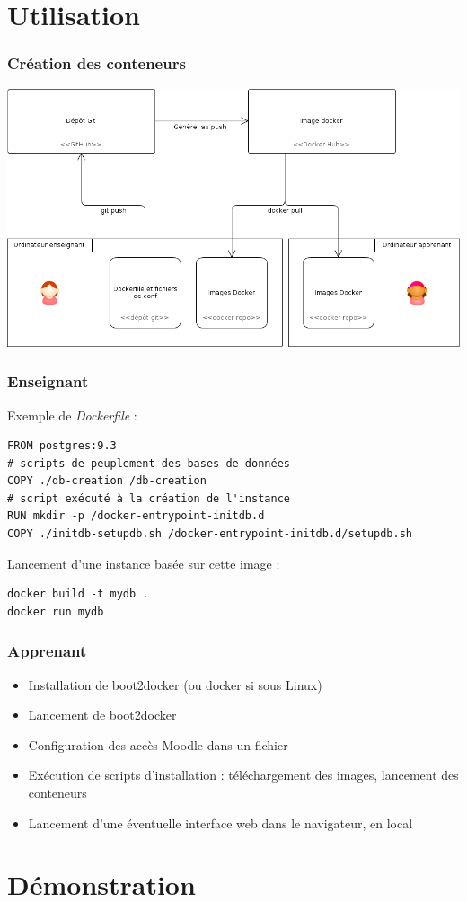 \documentclass[10pt, compress]{beamer}
\begin{document}
\section{Utilisation}

\begin{frame}[fragile]
  \frametitle{Création des conteneurs}
  \begin{center}
  \includegraphics[scale = 0.35]{infrastructure-creation.png}
   \end{center}
\end{frame}

\begin{frame}[fragile]
  \frametitle{Enseignant}

  Exemple de \emph{Dockerfile} :

  \begin{verbatim}
FROM postgres:9.3
# scripts de peuplement des bases de données
COPY ./db-creation /db-creation
# script exécuté à la création de l'instance
RUN mkdir -p /docker-entrypoint-initdb.d
COPY ./initdb-setupdb.sh /docker-entrypoint-initdb.d/setupdb.sh
  \end{verbatim}
  
  Lancement d'une instance basée sur cette image :
  
    \begin{verbatim}
docker build -t mydb .
docker run mydb
  \end{verbatim}
  
\end{frame}

\begin{frame}[fragile]
  \frametitle{Apprenant}

  \begin{itemize}[<+- | alert@+>]
      \item Installation de boot2docker (ou docker si sous Linux)
      \item Lancement de boot2docker
      \item Configuration des accès Moodle dans un fichier
      \item Exécution de scripts d'installation : téléchargement des images, lancement des conteneurs
      \item Lancement d'une éventuelle interface web dans le navigateur, en local
    \end{itemize}
  
\end{frame}


\section{Démonstration}

\end{document}
